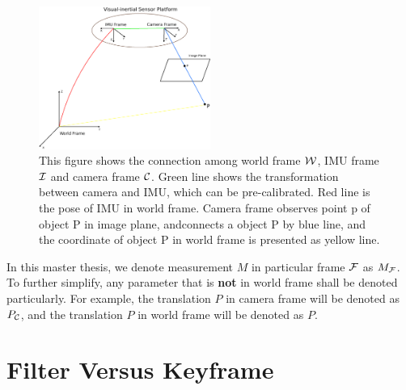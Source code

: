 \begin{figure}[t]
    \centering
    \includegraphics[width=0.5\textwidth]{CONTENT/Figure/Figure2-1_World.png}
    \caption{This figure shows the connection among world frame $\mathcal{W}$, IMU frame $\mathcal{I}$
    and camera frame $\mathcal{C}$. Green line shows the transformation between camera and
    IMU, which can be pre-calibrated. Red line is the pose of IMU in world frame.
    Camera frame observes point p of object P in image plane, andconnects a object P by
    blue line, and the coordinate of object P
    in world frame is presented as yellow line.}
    \label{fig:fig2-1}
\end{figure}

In this master thesis, we denote measurement $M$ in particular frame $\mathcal{F}$ as $M_{\mathcal{F}}$. 
To further simplify, any parameter that is \textbf{not} in world frame shall 
be denoted particularly. For example, the translation $P$ in camera frame will 
be denoted as $P_{\mathcal{C}}$, and the translation $P$ in world frame will 
be denoted as $P$. 


\section{Filter Versus Keyframe}
\label{sec:FVK}
   
